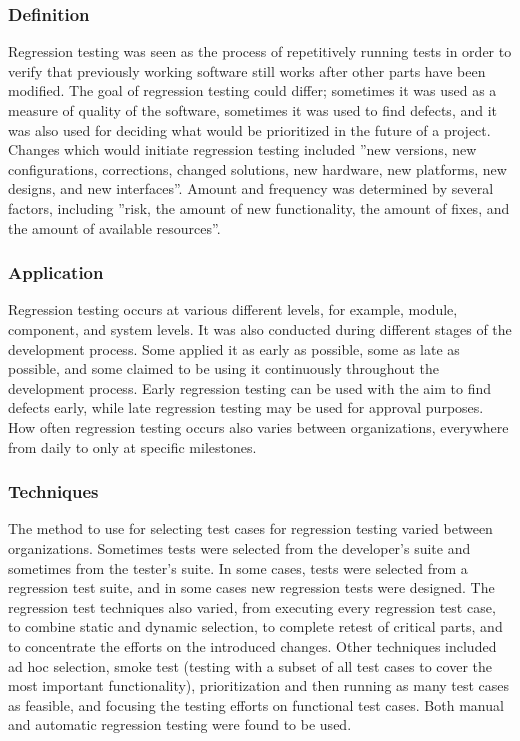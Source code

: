 \documentclass[a4paper,english,12pt]{report}
\begin{document}
\subsubsection{Definition}
Regression testing was seen as the process of repetitively running tests in order to verify that previously working software still works after other parts have been modified. The goal of regression testing could differ; sometimes it was used as a measure of quality of the software, sometimes it was used to find defects, and it was also used for deciding what would be prioritized in the future of a project. Changes which would initiate regression testing included ''new versions, new configurations, corrections, changed solutions, new hardware, new platforms, new designs, and new interfaces''. Amount and frequency was determined by several factors, including ''risk, the amount of new functionality, the amount of fixes, and the amount of available resources''. \citep[p. 249]{runeson2012regression}

\subsubsection{Application}
Regression testing occurs at various different levels, for example, module, component, and system levels. It was also conducted during different stages of the development process. Some applied it as early as possible, some as late as possible, and some claimed to be using it continuously throughout the development process. Early regression testing can be used with the aim to find defects early, while late regression testing may be used for approval purposes. How often regression testing occurs also varies between organizations, everywhere from daily to only at specific milestones. \citep[p. 249]{runeson2012regression}

\subsubsection{Techniques}
The method to use for selecting test cases for regression testing varied between organizations. Sometimes tests were selected from the developer's suite and sometimes from the tester's suite. In some cases, tests were selected from a regression test suite, and in some cases new regression tests were designed. The regression test techniques also varied, from executing every regression test case, to combine static and dynamic selection, to complete retest of critical parts, and to concentrate the efforts on the introduced changes. Other techniques included ad hoc selection, smoke test (testing with a subset of all test cases to cover the most important functionality), prioritization and then running as many test cases as feasible, and focusing the testing efforts on functional test cases. Both manual and automatic regression testing were found to be used. \citep[p. 250]{runeson2012regression}
\end{document}
